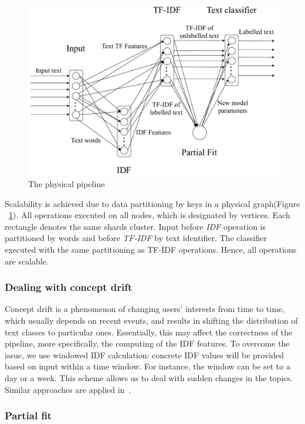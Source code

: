 \begin{figure}[htbp]
  \centering
  \includegraphics[scale=0.375]{pics/physical-graph}
  \caption{The physical pipeline}
  \label {physical_graph}
\end{figure}

Scalability is achieved due to data partitioning by keys in a physical graph(Figure ~\ref{physical_graph}). All operations executed on all nodes, which is designated by vertices. Each rectangle denotes the same shards cluster. Input before {\em IDF} operation is partitioned by words and before {\em TF-IDF} by text identifier. The classifier executed with the same partitioning as TF-IDF operations. Hence, all operations are scalable. 

\subsubsection{Dealing with concept drift}

Concept drift is a phenomenon of changing users' interests from time to time, which usually depends on recent events, and results in shifting the distribution of text classes to particular ones. Essentially, this may affect the correctness of the pipeline, more specifically, the computing of the IDF features. To overcome the issue, we use windowed IDF calculation: concrete IDF values will be provided based on input within a time window. For instance, the window can be set to a day or a week. This scheme allows us to deal with sudden changes in the topics. Similar approaches are applied in~\cite{klinkenberg2000detecting}.

\subsubsection{Partial fit}

